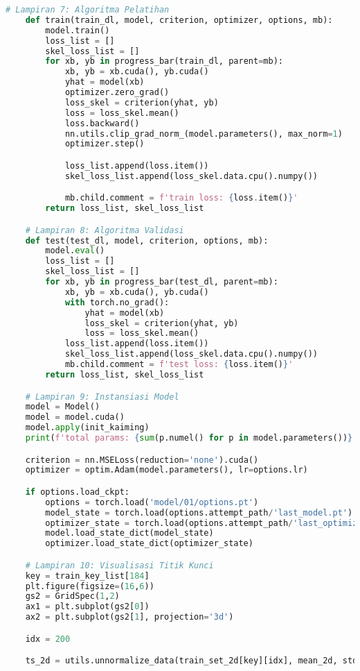 \begin{lstlisting}[language=Python,multicols=2,basicstyle=\scriptsize\mdseries,breaklines=true]
    # Lampiran 7: Algoritma Pelatihan
    def train(train_dl, model, criterion, optimizer, options, mb):
        model.train()
        loss_list = []
        skel_loss_list = []
        for xb, yb in progress_bar(train_dl, parent=mb):
            xb, yb = xb.cuda(), yb.cuda()
            yhat = model(xb)
            optimizer.zero_grad()
            loss_skel = criterion(yhat, yb)
            loss = loss_skel.mean()
            loss.backward()
            nn.utils.clip_grad_norm_(model.parameters(), max_norm=1)
            optimizer.step()

            loss_list.append(loss.item())
            skel_loss_list.append(loss_skel.data.cpu().numpy())

            mb.child.comment = f'train loss: {loss.item()}'
        return loss_list, skel_loss_list

    # Lampiran 8: Algoritma Validasi
    def test(test_dl, model, criterion, options, mb):
        model.eval()
        loss_list = []
        skel_loss_list = []
        for xb, yb in progress_bar(test_dl, parent=mb):
            xb, yb = xb.cuda(), yb.cuda()
            with torch.no_grad():
                yhat = model(xb)
                loss_skel = criterion(yhat, yb)
                loss = loss_skel.mean()
            loss_list.append(loss.item())
            skel_loss_list.append(loss_skel.data.cpu().numpy())
            mb.child.comment = f'test loss: {loss.item()}'
        return loss_list, skel_loss_list

    # Lampiran 9: Instansiasi Model
    model = Model()
    model = model.cuda()
    model.apply(init_kaiming)
    print(f'total params: {sum(p.numel() for p in model.parameters())}')

    criterion = nn.MSELoss(reduction='none').cuda()
    optimizer = optim.Adam(model.parameters(), lr=options.lr)

    if options.load_ckpt:
        options = torch.load('model/01/options.pt')
        model_state = torch.load(options.attempt_path/'last_model.pt')
        optimizer_state = torch.load(options.attempt_path/'last_optimizer.pt')
        model.load_state_dict(model_state)
        optimizer.load_state_dict(optimizer_state)

    # Lampiran 10: Visualisasi Titik Kunci
    key = train_key_list[184]
    plt.figure(figsize=(16,6))
    gs2 = GridSpec(1,2)
    ax1 = plt.subplot(gs2[0])
    ax2 = plt.subplot(gs2[1], projection='3d')

    idx = 200

    ts_2d = utils.unnormalize_data(train_set_2d[key][idx], mean_2d, std_2d, dim_ignore_2d)[0]


\end{lstlisting}
